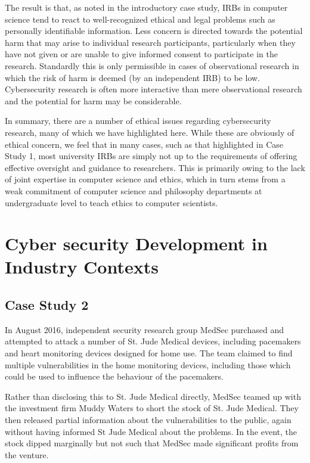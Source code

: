 \documentclass{svjour3}                     %
\begin{document}
\begin{itemize}
The result is that, as noted in the introductory case study, IRBs in computer science tend to react to well-recognized ethical and legal problems such as personally identifiable information. Less concern is directed towards the potential harm that may arise to individual research participants, particularly when they have not given or are unable to give informed consent to participate in the research. Standardly this is only permissible in cases of observational research in which the risk of harm is deemed (by an independent IRB) to be low. Cybersecurity research is often more interactive than mere observational research and the potential for harm may be considerable.
\end{itemize}

\label{sec:summary}
In summary, there are a number of ethical issues regarding cybersecurity research, many of which we have highlighted here.  While these are obviously of ethical concern, we feel that in many cases, such as that highlighted in Case Study 1, most university IRBs are simply not up to the requirements of offering effective oversight and guidance to researchers. This is primarily owing to the lack of joint expertise in computer science and ethics, which in turn stems from a weak commitment of computer science and philosophy departments at undergraduate level to teach ethics to computer scientists.

\section{ Cyber security Development in Industry Contexts }
\label{sec:practice}
\subsection{Case Study 2}
\label{sec:case2}
In August 2016, independent security research group MedSec purchased and attempted to attack a number of St. Jude Medical devices, including pacemakers and heart monitoring devices designed for home use. The team claimed to find multiple vulnerabilities in the home monitoring devices, including those which could be used to influence the behaviour of the pacemakers.

Rather than disclosing this to St. Jude Medical directly, MedSec teamed up with the investment firm Muddy Waters to short the stock of St. Jude Medical. They then released partial information about the vulnerabilities to the public, again without having informed St Jude Medical about the problems.  In the event, the stock dipped marginally but not such that MedSec made significant profits from the venture.
\end{document}
